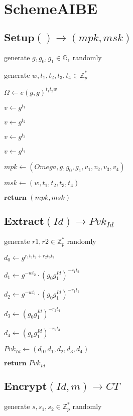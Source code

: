 \documentclass[a4paper]{article}
\begin{document}
\section{SchemeAIBE}

\subsection{$\textbf{Setup}() \rightarrow (\textit{mpk}, \textit{msk})$}

generate $g, g_0, g_1 \in \mathbb{G}_1$ randomly

generate $w, t_1, t_2, t_3, t_4 \in \mathbb{Z}_p^*$

$\Omega \gets e(g, g)^{t_1 t_2 w}$

$v \gets g^{t_1}$

$v \gets g^{t_2}$

$v \gets g^{t_3}$

$v \gets g^{t_4}$

$\textit{mpk} \gets (Omega, g, g_0, g_1, v_1, v_2, v_3, v_4)$

$\textit{msk} \gets (w, t_1, t_2, t_3, t_4)$

$\textbf{return }(\textit{mpk}, \textit{msk})$

\subsection{$\textbf{Extract}(\textit{Id}) \rightarrow \textit{Pvk}_\textit{Id}$}

generate $r1, r2 \in \mathbb{Z}_p^*$ randomly

$d_0 \gets g^{r_1 t_1 t_2 + r_2 t_3 t_4}$

$d_1 \gets g^{- w t_2} \cdot (g_0 g_1^\textit{Id})^{-  r_1 t_2}$

$d_2 \gets g^{- w t_1} \cdot (g_0 g_1^\textit{Id})^{-  r_1 t_1}$

$d_3 \gets (g_0 g_1^\textit{Id})^{-  r_2 t_4}$

$d_4 \gets (g_0 g_1^\textit{Id})^{-  r_2 t_3}$

$\textit{Pvk}_\textit{Id} \gets (d_0, d_1, d_2, d_3, d_4)$

$\textbf{return }\textit{Pvk}_\textit{Id}$

\subsection{$\textbf{Encrypt}(\textit{Id}, m) \rightarrow \textit{CT}$}

generate $s, s_1, s_2 \in \mathbb{Z}_p^*$ randomly
\end{document}
